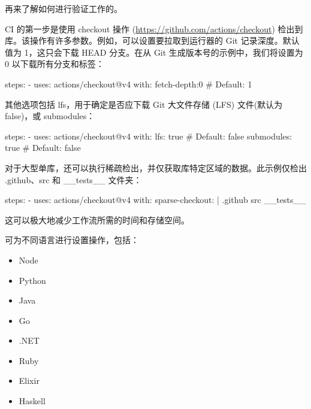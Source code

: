
再来了解如何进行验证工作的。


CI 的第一步是使用 checkout 操作 (\url{https://github.com/actions/checkout}) 检出到库。该操作有许多参数。例如，可以设置要拉取到运行器的 Git 记录深度。默认值为 1，这只会下载 HEAD 分支。在从 Git 生成版本号的示例中，我们将设置为 0 以下载所有分支和标签：

\begin{shell}
steps:
  - uses: actions/checkout@v4
    with:
      fetch-depth:0 # Default: 1
\end{shell}

其他选项包括 lfs，用于确定是否应下载 Git 大文件存储 (LFS) 文件(默认为 false)，或 submodules：

\begin{shell}
steps:
  - uses: actions/checkout@v4
    with:
      lfs: true # Default: false
      submodules: true # Default: false
\end{shell}
  
对于大型单库，还可以执行稀疏检出，并仅获取库特定区域的数据。此示例仅检出 .github、src 和 \_\_tests\_\_ 文件夹：

\begin{shell}
steps:
  - uses: actions/checkout@v4
    with:
      sparse-checkout: |
        .github
        src
        __tests__
\end{shell}

这可以极大地减少工作流所需的时间和存储空间。


可为不同语言进行设置操作，包括：

\begin{itemize}
\item 
Node

\item
Python

\item
Java

\item
Go

\item
.NET

\item
Ruby

\item
Elixir

\item
Haskell
\end{itemize}

